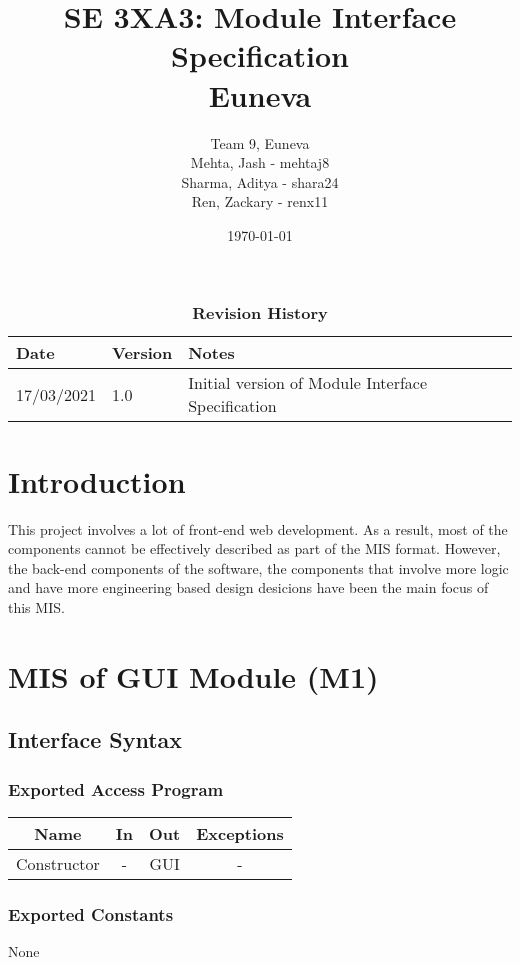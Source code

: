 \documentclass[12pt, titlepage]{article}
\title{SE 3XA3: Module Interface Specification\\Euneva}
\author{Team 9, Euneva
		\\ Mehta, Jash - mehtaj8
		\\ Sharma, Aditya - shara24
		\\ Ren, Zackary - renx11
}
\date{\today}
\begin{document}
\maketitle

\tableofcontents
\listoftables
\listoffigures

\begin{table}[bp]
\begin{tabularx}{\textwidth}{p{3cm}p{2cm}X}
\toprule {\bf Date} & {\bf Version} & {\bf Notes}\\
\midrule
17/03/2021 & 1.0 & Initial version of Module Interface Specification\\
\bottomrule
\end{tabularx}
\caption{\bf Revision History}
\end{table}

\newpage

\section{Introduction}
This project involves a lot of front-end web development. As a result,
most of the components cannot be effectively described as part of the MIS format.
However, the back-end components of the software, the components that involve
more logic and have more engineering based design desicions have been the main
focus of this MIS.

\newpage

\section{MIS of GUI Module (M1)}
\subsection{Interface Syntax}
\subsubsection{Exported Access Program}
\begin{tabular}[pos]{|c|c|c|c|}
    \hline
    \textbf{Name}& \textbf{In} & \textbf{Out} & \textbf{Exceptions} \\ \hline
    Constructor & - & GUI & -\\ \hline
\end{tabular}
\subsubsection{Exported Constants}
None
\end{document}
